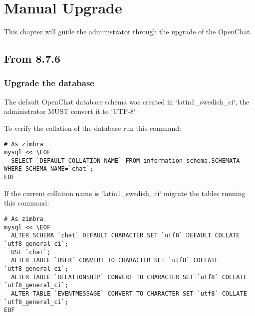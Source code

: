 \chapter{Manual Upgrade}

This chapter will guide the administrator through the upgrade of the OpenChat.

\section{From 8.7.6}
\subsection{Upgrade the database}
The default OpenChat database schema was created in `latin1\_swedish\_ci`, the administrator MUST convert it to `UTF-8`

To verify the collation of the database run this command:
\begin{verbatim}
# As zimbra
mysql << \EOF
  SELECT `DEFAULT_COLLATION_NAME` FROM information_schema.SCHEMATA WHERE SCHEMA_NAME=`chat`;
EOF
\end{verbatim}
If the current collation name is `latin1\_swedish\_ci` migrate the tables running this command:
\begin{verbatim}
# As zimbra
mysql << \EOF
  ALTER SCHEMA `chat` DEFAULT CHARACTER SET `utf8` DEFAULT COLLATE `utf8_general_ci`;
  USE `chat`;
  ALTER TABLE `USER` CONVERT TO CHARACTER SET `utf8` COLLATE `utf8_general_ci`;
  ALTER TABLE `RELATIONSHIP` CONVERT TO CHARACTER SET `utf8` COLLATE `utf8_general_ci`;
  ALTER TABLE `EVENTMESSAGE` CONVERT TO CHARACTER SET `utf8` COLLATE `utf8_general_ci`;
EOF
\end{verbatim}
